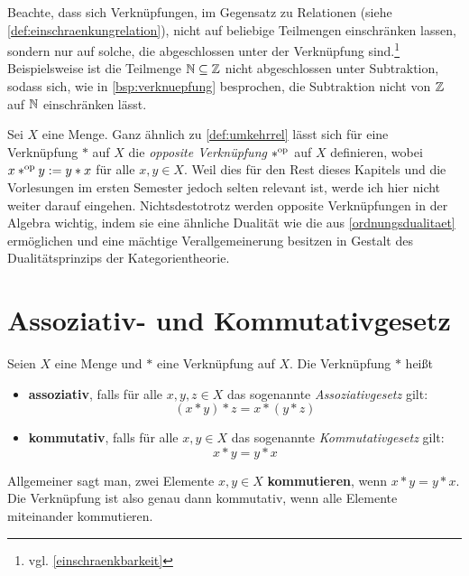 \begin{bem}
    Beachte, dass sich Verknüpfungen, im Gegensatz zu Relationen (siehe \cref{def:einschraenkungrelation}), nicht auf beliebige Teilmengen einschränken lassen, sondern nur auf solche, die abgeschlossen unter der Verknüpfung sind.\footnote{vgl. \cref{einschraenkbarkeit}} Beispielsweise ist die Teilmenge $\mathbb N\subseteq \mathbb Z$ nicht abgeschlossen unter Subtraktion, sodass sich, wie in \cref{bsp:verknuepfung} besprochen, die Subtraktion nicht von $\mathbb Z$ auf $\mathbb N$ einschränken lässt.
\end{bem}


\begin{vorschau}
    Sei $X$ eine Menge. Ganz ähnlich zu \cref{def:umkehrrel} lässt sich für eine Verknüpfung $*$ auf $X$ die \emph{opposite Verknüpfung} $*^{\mathrm{op}}$ auf $X$ definieren, wobei $x*^{\mathrm{op}} y:=y*x$ für alle $x,y\in X$. Weil dies für den Rest dieses Kapitels und die Vorlesungen im ersten Semester jedoch selten relevant ist, werde ich hier nicht weiter darauf eingehen. Nichtsdestotrotz werden opposite Verknüpfungen in der Algebra wichtig, indem sie eine ähnliche Dualität wie die aus \cref{ordnungsdualitaet} ermöglichen und eine mächtige Verallgemeinerung besitzen in Gestalt des Dualitätsprinzips der Kategorientheorie.
\end{vorschau}




\section{Assoziativ- und Kommutativgesetz}


\begin{defin}  
    Seien $X$ eine Menge und $*$ eine Verknüpfung auf $X$. Die Verknüpfung $*$ heißt
    \begin{itemize}
        \item \textbf{assoziativ}, falls für alle $x,y,z\in X$ das sogenannte \emph{Assoziativgesetz} gilt:
            \[ (x*y)*z = x*(y*z) \]
        \item \textbf{kommutativ}, falls für alle $x,y\in X$ das sogenannte \emph{Kommutativgesetz} gilt:
            \[ x*y = y*x \]
    \end{itemize}
    Allgemeiner sagt man, zwei Elemente $x,y\in X$ \textbf{kommutieren}, wenn $x*y=y*x$. Die Verknüpfung ist also genau dann kommutativ, wenn alle Elemente miteinander kommutieren.
\end{defin}


